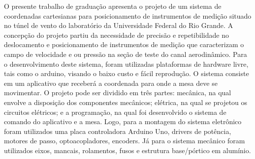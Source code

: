O presente trabalho de graduação apresenta o projeto de um sistema de coordenadas cartesianas para 
posicionamento de instrumentos de medição situado no túnel de vento do laboratório da Universidade 
Federal do Rio Grande. A concepção do projeto partiu da necessidade de precisão e repetibilidade  
no deslocamento  e posicionamento de instrumentos de medição  que caracterizam  o campo de velocidade 
e ou pressão na seção de teste do canal aerodinâmico. Para o desenvolvimento deste sistema, foram 
utilizadas plataformas de hardware livre, tais como o arduino, visando o baixo custo e fácil 
reprodução. O sistema consiste em um aplicativo que receberá a coordenada para onde a mesa deve 
se movimentar. O projeto pode ser dividido em três partes: mecânica, na qual envolve a disposição 
dos componentes mecânicos; elétrica, na qual se projetou os circuitos elétricos; e a programação, 
na qual foi desenvolvido o sistema de comando do aplicativo e a mesa. Logo, para a montagem do sistema 
eletrônico foram utilizados uma placa controladora  Arduino Uno, drivers de potência, motores de passo, 
optoacopladores, encoders. Já para o sistema mecânico foram utilizados eixos, mancais, rolamentos, 
fusos e  estrutura base/pórtico em alumínio.

